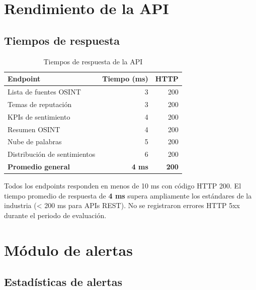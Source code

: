 \documentclass[11pt,a4paper]{article}
\begin{document}
\section{Rendimiento de la API}

\subsection{Tiempos de respuesta}

\begin{table}[H]
\centering
\begin{tabularx}{\textwidth}{X r r}
\toprule
\textbf{Endpoint} & \textbf{Tiempo (ms)} & \textbf{HTTP} \\
\midrule
Lista de fuentes OSINT & 3 & 200 \\
\rowcolor{tablerow}
Temas de reputación & 3 & 200 \\
KPIs de sentimiento & 4 & 200 \\
\rowcolor{tablerow}
Resumen OSINT & 4 & 200 \\
Nube de palabras & 5 & 200 \\
\rowcolor{tablerow}
Distribución de sentimientos & 6 & 200 \\
\midrule
\textbf{Promedio general} & \textbf{4 ms} & \textbf{200} \\
\bottomrule
\end{tabularx}
\caption{Tiempos de respuesta de la API}
\end{table}

\begin{successbox}
Todos los endpoints responden en menos de 10 ms con código HTTP 200. El tiempo promedio de respuesta de \textbf{4 ms} supera ampliamente los estándares de la industria (< 200 ms para APIs REST). No se registraron errores HTTP 5xx durante el periodo de evaluación.
\end{successbox}

\section{Módulo de alertas}

\subsection{Estadísticas de alertas}
\end{document}
